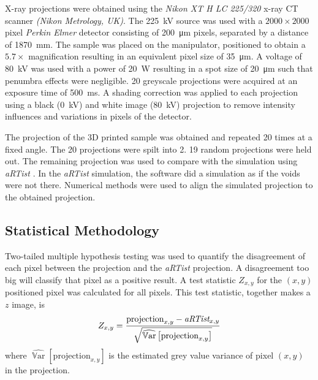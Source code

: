 \documentclass{proc}
\DeclareMathOperator{\variance}{\mathbb{V}ar}
\begin{document}
X-ray projections were obtained using the \emph{Nikon XT H LC 225/320} x-ray CT scanner \emph{(Nikon Metrology, UK)}. The \SI{225}{\kilo\volt} source was used with a $2000\times2000$ pixel \emph{Perkin Elmer} detector consisting of \SI{200}{\micro\metre} pixels, separated by a distance of \SI{1870}{\milli\metre}. The sample was placed on the manipulator, positioned to obtain a $5.7\times$ magnification resulting in an equivalent pixel size of \SI{35}{\micro\metre}. A voltage of \SI{80}{\kilo\volt} was used with a power of \SI{20}{\watt} resulting in a spot size of \SI{20}{\micro\metre} such that penumbra effects were negligible. 20 greyscale projections were acquired at an exposure time of \SI{500}{\milli\second}. A shading correction \citep{young2000shading, munzenmayer2003enhancing} was applied to each projection using a black (\SI{0}{\kilo\volt}) and white image (\SI{80}{\kilo\volt}) projection to remove intensity influences and variations in pixels of the detector.

The projection of the 3D printed sample was obtained and repeated 20 times at a fixed angle. The 20 projections were spilt into 2. 19 random projections were held out. The remaining projection was used to compare with the simulation using \emph{aRTist} \citep{bellon2007artist, jaenisch2008artist, bellon2012radiographic}. In the \emph{aRTist} simulation, the software did a simulation as if the voids were not there. Numerical methods were used to align the simulated projection to the obtained projection.

\subsection{Statistical Methodology}

Two-tailed multiple hypothesis testing \citep{pearson1900on, neyman1933on, fisher1970statistical} was used to quantify the disagreement of each pixel between the projection and the \emph{aRTist} projection. A disagreement too big will classify that pixel as a positive result. A test statistic $Z_{x,y}$ for the $(x,y)$ positioned pixel was calculated for all pixels. This test statistic, together makes a $z$ image, is
\begin{equation}
  Z_{x,y} = 
  \dfrac{
    \text{projection}_{x,y} - \emph{aRTist}_{x,y}
  }
  {
    \sqrt{\widehat{\variance}\left[\text{projection}_{x,y}\right]}
  }
\end{equation}
where $\widehat{\variance}\left[\text{projection}_{x,y}\right]$ is the estimated grey value variance of pixel $(x,y)$ in the projection.
\end{document}
